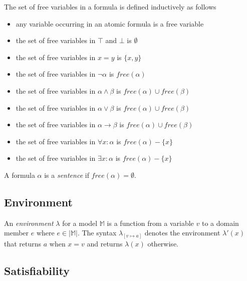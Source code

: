 		The set of free variables in a formula is defined inductively as follows
		\begin{itemize}
		\item any variable occurring in an atomic formula is a free variable
		\item the set of free variables in $\top$ and $\bot$ is $\emptyset$
		\item the set of free variables in $x = y$ is $\{x,y\}$
		\item the set of free variables in $\neg\alpha$ is $free(\alpha)$
		\item the set of free variables in $\alpha \wedge \beta$ is $free(\alpha) \cup free(\beta)$
		\item the set of free variables in $\alpha \vee   \beta$ is $free(\alpha) \cup free(\beta)$
		\item the set of free variables in $\alpha \to    \beta$ is $free(\alpha) \cup free(\beta)$
		\item the set of free variables in $\forall x : \alpha$ is $free(\alpha) - \{x\}$
		\item the set of free variables in $\exists x : \alpha$ is $free(\alpha) - \{x\}$
		\end{itemize}
		A formula $\alpha$ is a \emph{sentence} if $free(\alpha) = \emptyset$.

	\subsection{Environment}

		An \emph{environment} $\lambda$ for a model $\mathbb{M}$ is a function
		from a variable $v$ to a domain member $e$ where $e \in |\mathbb{M}|$.
		The syntax $\lambda_{[v \mapsto a]}$ denotes the environment
		$\lambda'(x)$ that returns $a$ when $x=v$ and returns $\lambda(x)$
		otherwise.

	\subsection{Satisfiability}

